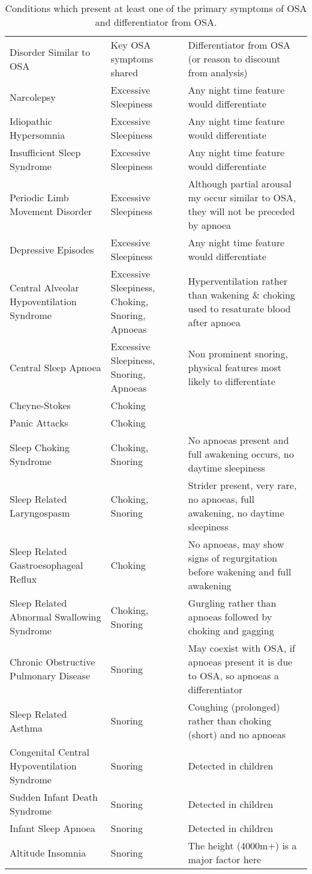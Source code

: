 \begin{table}[h]
\centering
\begin{tabular}{l l l}
Disorder Similar to OSA & Key OSA symptoms shared & Differentiator from OSA (or reason to discount from analysis) \\
Narcolepsy & Excessive Sleepiness & Any night time feature would differentiate\\
Idiopathic Hypersomnia & Excessive Sleepiness & Any night time feature would differentiate\\
Insufficient Sleep Syndrome & Excessive Sleepiness & Any night time feature would differentiate\\
Periodic Limb Movement Disorder & Excessive Sleepiness & Although partial arousal my occur similar to OSA, they will not be preceded by apnoea\\
Depressive Episodes & Excessive Sleepiness & Any night time feature would differentiate\\
Central Alveolar Hypoventilation Syndrome & Excessive Sleepiness, Choking, Snoring, Apnoeas & Hyperventilation rather than wakening \& choking used to resaturate blood after apnoea\\
Central Sleep Apnoea & Excessive Sleepiness, Snoring, Apnoeas & Non prominent snoring, physical features most likely to differentiate\\
Cheyne-Stokes & Choking &  \\
Panic Attacks & Choking &  \\
Sleep Choking Syndrome & Choking, Snoring & No apnoeas present and full awakening occurs, no daytime sleepiness\\
Sleep Related Laryngospasm & Choking, Snoring & Strider present, very rare, no apnoeas, full awakening, no daytime sleepiness\\
Sleep Related Gastroesophageal Reflux & Choking & No apnoeas, may show signs of regurgitation before wakening and full awakening\\
Sleep Related Abnormal Swallowing Syndrome & Choking, Snoring & Gurgling rather than apnoeas followed by choking and gagging\\
Chronic Obstructive Pulmonary Disease & Snoring & May coexist with OSA, if apnoeas present it is due to OSA, so apnoeas a differentiator\\
Sleep Related Asthma & Snoring & Coughing (prolonged) rather than choking (short) and no apnoeas\\
Congenital Central Hypoventilation Syndrome & Snoring & Detected in children\\
Sudden Infant Death Syndrome & Snoring & Detected in children\\
Infant Sleep Apnoea & Snoring & Detected in children\\
Altitude Insomnia & Snoring & The height (4000m+) is a major factor here\\
\end{tabular}
\caption{Conditions which present at least one of the primary symptoms of OSA and differentiator from OSA.}
\label{table:X2}
\end{table}
